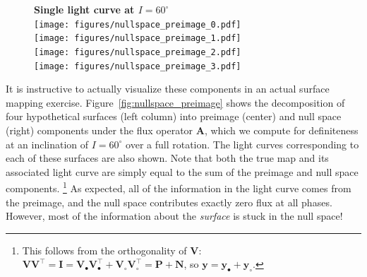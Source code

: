 \documentclass[modern]{aastex62}
\begin{document}
\begin{figure}[p!]
    \begin{centering}
        \textbf{Single light curve at $I = 60^\circ$}
        \\[1em]
        \texttt{[image: figures/nullspace\_preimage\_0.pdf]}
        \\[1em]
        \texttt{[image: figures/nullspace\_preimage\_1.pdf]}
        \\[1em]
        \texttt{[image: figures/nullspace\_preimage\_2.pdf]}
        \\[1em]
        \texttt{[image: figures/nullspace\_preimage\_3.pdf]}
    \end{centering}
\end{figure}

It is instructive to actually visualize these components in
an actual surface mapping exercise. Figure~\ref{fig:nullspace_preimage}
shows the decomposition of four hypothetical surfaces (left
column) into preimage (center) and null space (right)
components under the flux operator $\mathbf{A}$, which we compute for
definiteness at an inclination of $I = 60^\circ$ over a full rotation.
The light curves corresponding to each of these surfaces are also shown.
Note that both the true map and its associated light curve are simply equal to
the sum of the preimage and null space components.%
\footnote{%
    This follows from the orthogonality of $\mathbf{V}$:
    $
        \mathbf{V} \mathbf{V}^\top =
        \mathbf{I} =
        \mathbf{V}_\bullet \mathbf{V}_\bullet^\top  + \mathbf{V}_\circ \mathbf{V}_\circ^\top =
        \mathbf{P} + \mathbf{N}
    $, so $\mathbf{y} = \mathbf{y}_\bullet + \mathbf{y}_\circ$.
}
%
As expected, all of the information in the light curve comes
from the preimage, and the null space contributes exactly zero
flux at all phases. However, most of the information about the
\emph{surface} is stuck in the null space!
\end{document}
